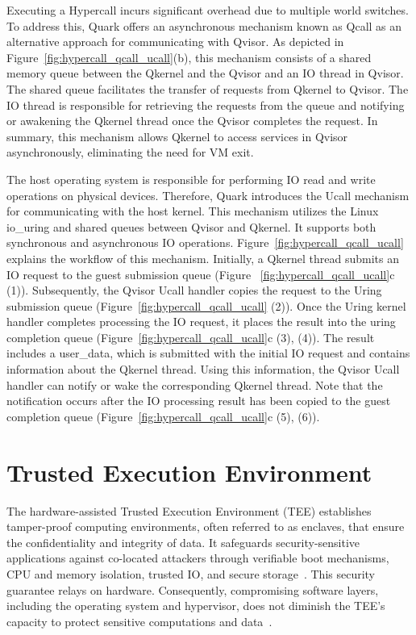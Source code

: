 Executing a Hypercall incurs significant overhead due to multiple world switches. To address this, Quark offers an asynchronous mechanism known as Qcall as an alternative approach for communicating with Qvisor. As depicted in Figure~\ref{fig:hypercall_qcall_ucall}(b), this mechanism consists of a 
shared memory queue between the Qkernel and the Qvisor and an IO thread in Qvisor. The shared queue facilitates the transfer of requests from Qkernel to Qvisor. The IO thread is responsible for retrieving the requests from the queue and notifying or awakening the Qkernel thread once the Qvisor completes the request. In summary,   
this mechanism allows Qkernel to access services in Qvisor asynchronously, eliminating the need for VM exit. 

The host operating system is responsible for performing IO read and write operations on physical devices. Therefore, Quark introduces the Ucall mechanism for communicating with the host kernel. This mechanism utilizes the Linux io\_uring and shared queues between Qvisor and Qkernel. It supports
both synchronous and asynchronous IO operations. Figure~\ref{fig:hypercall_qcall_ucall} explains the workflow of this mechanism. Initially, a Qkernel thread submits an IO request to the guest submission queue (Figure ~\ref{fig:hypercall_qcall_ucall}c (1)). Subsequently, the Qvisor Ucall handler copies the request to the Uring submission queue 
(Figure~\ref{fig:hypercall_qcall_ucall} (2)). Once the Uring kernel handler completes processing the IO request, it places the result into the uring completion queue (Figure~\ref{fig:hypercall_qcall_ucall}c (3), (4)). The result includes a user\_data, which is submitted with the initial IO 
request and contains information about the Qkernel thread. Using this information, the Qvisor Ucall handler can notify or wake the corresponding Qkernel thread. Note that the notification occurs after the IO processing result has been copied to the guest completion 
queue (Figure~\ref{fig:hypercall_qcall_ucall}c (5), (6)).

\section{Trusted Execution Environment}

The hardware-assisted Trusted Execution Environment (TEE) establishes tamper-proof computing environments, often referred to as enclaves, that ensure the confidentiality and integrity of data. It safeguards security-sensitive applications against co-located attackers through verifiable boot mechanisms, 
CPU and memory isolation, trusted IO, and secure storage~\cite*{Hardware-supported-TEE}. This security guarantee relays on hardware. Consequently, compromising software layers, including the operating system and hypervisor, does not diminish the TEE's capacity to protect sensitive 
computations and data~\cite*{7345265}.


